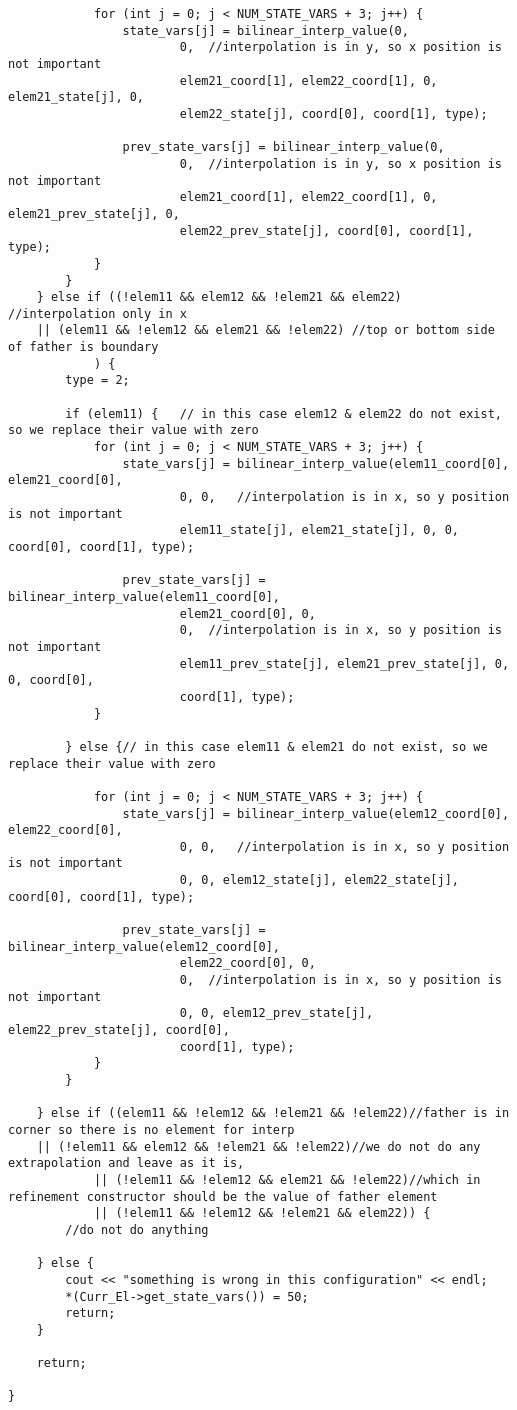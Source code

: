\documentclass[a4paper,10pt]{article}
\begin{document}
\begin{lstlisting}
			for (int j = 0; j < NUM_STATE_VARS + 3; j++) {
				state_vars[j] = bilinear_interp_value(0,
						0,	//interpolation is in y, so x position is not important
						elem21_coord[1], elem22_coord[1], 0, elem21_state[j], 0,
						elem22_state[j], coord[0], coord[1], type);

				prev_state_vars[j] = bilinear_interp_value(0,
						0,	//interpolation is in y, so x position is not important
						elem21_coord[1], elem22_coord[1], 0, elem21_prev_state[j], 0,
						elem22_prev_state[j], coord[0], coord[1], type);
			}
		}
	} else if ((!elem11 && elem12 && !elem21 && elem22)	//interpolation only in x
	|| (elem11 && !elem12 && elem21 && !elem22)	//top or bottom side of father is boundary
			) {
		type = 2;

		if (elem11) {	// in this case elem12 & elem22 do not exist, so we replace their value with zero
			for (int j = 0; j < NUM_STATE_VARS + 3; j++) {
				state_vars[j] = bilinear_interp_value(elem11_coord[0], elem21_coord[0],
						0, 0,	//interpolation is in x, so y position is not important
						elem11_state[j], elem21_state[j], 0, 0, coord[0], coord[1], type);

				prev_state_vars[j] = bilinear_interp_value(elem11_coord[0],
						elem21_coord[0], 0,
						0,	//interpolation is in x, so y position is not important
						elem11_prev_state[j], elem21_prev_state[j], 0, 0, coord[0],
						coord[1], type);
			}

		} else {// in this case elem11 & elem21 do not exist, so we replace their value with zero

			for (int j = 0; j < NUM_STATE_VARS + 3; j++) {
				state_vars[j] = bilinear_interp_value(elem12_coord[0], elem22_coord[0],
						0, 0,	//interpolation is in x, so y position is not important
						0, 0, elem12_state[j], elem22_state[j], coord[0], coord[1], type);

				prev_state_vars[j] = bilinear_interp_value(elem12_coord[0],
						elem22_coord[0], 0,
						0,	//interpolation is in x, so y position is not important
						0, 0, elem12_prev_state[j], elem22_prev_state[j], coord[0],
						coord[1], type);
			}
		}

	} else if ((elem11 && !elem12 && !elem21 && !elem22)//father is in corner so there is no element for interp
	|| (!elem11 && elem12 && !elem21 && !elem22)//we do not do any extrapolation and leave as it is,
			|| (!elem11 && !elem12 && elem21 && !elem22)//which in refinement constructor should be the value of father element
			|| (!elem11 && !elem12 && !elem21 && elem22)) {
		//do not do anything

	} else {
		cout << "something is wrong in this configuration" << endl;
		*(Curr_El->get_state_vars()) = 50;
		return;
	}

	return;

}
\end{lstlisting}
 
 \newpage


\end{document}
